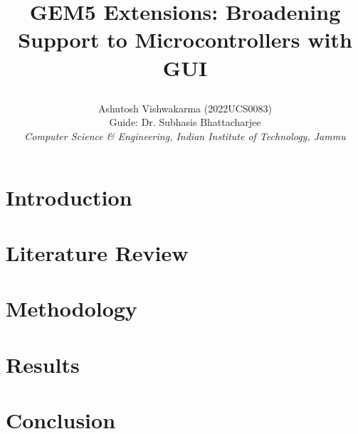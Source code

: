 \documentclass[conference]{IEEEtran}
\begin{document}
\title{
  \hfill
  \parbox{0.8\textwidth}{\centering GEM5 Extensions: Broadening Support to Microcontrollers with GUI}
  \hfill
}

\author{Ashutosh Vishwakarma (2022UCS0083)\\
	Guide: Dr. Subhasis Bhattacharjee\\
	\textit{Computer Science \& Engineering,
	Indian Institute of Technology, Jammu}}


\maketitle

\newpage

\begin{abstract}
	
\end{abstract}

\section{Introduction}


\section{Literature Review}


\section{Methodology}


\section{Results}


\section{Conclusion}




\end{document}
